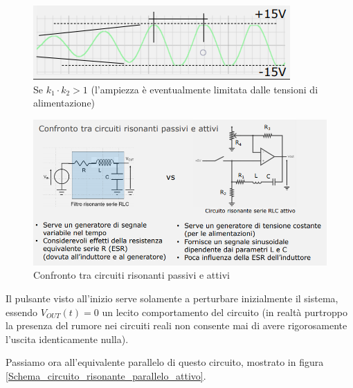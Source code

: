 \documentclass{article}
\begin{document}
\begin{figure}[h]
  \centering
  \includegraphics[scale=0.7]{IM_circuito_risonante_serie_attivo_grafico_2}
  \caption{Se $k_1 \cdot k_2 > 1$ (l'ampiezza è eventualmente limitata dalle tensioni di alimentazione)}
  \label{Schema_circuito_risonante_serie_attivo_grafico_2}
\end{figure}

\begin{figure}[h]
  \centering
  \includegraphics[scale=0.7]{IM_confronto_attivi_passivi}
  \caption{Confronto tra circuiti risonanti passivi e attivi}
  \label{Schema_confronto_attivi_passivi}
\end{figure}

Il pulsante visto all'inizio serve solamente a perturbare inizialmente il sistema, essendo $V_{OUT} (t) = 0$ un lecito comportamento del circuito (in realtà purtroppo la presenza del rumore nei circuiti reali non consente mai di avere rigorosamente l'uscita identicamente nulla).

\clearpage

Passiamo ora all'equivalente parallelo di questo circuito, mostrato in figura \ref{Schema_circuito_risonante_parallelo_attivo}.
\end{document}
